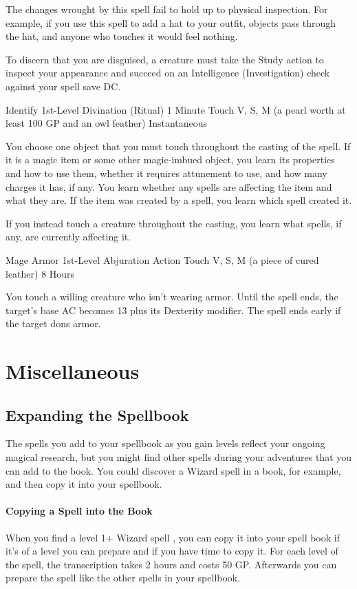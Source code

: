 \documentclass[letterpaper,openany,oneside,twocolumn]{book}
\begin{document}
The changes wrought by this spell fail to hold up to physical inspection. For example, if you use this spell to add a hat to your outfit, objects pass through the hat, and anyone who touches it would feel nothing. 

To discern that you are disguised, a creature must take the Study action to inspect your appearance and succeed on an Intelligence (Investigation) check against your spell save DC. 

\DndSpellHeader
  {Identify}
  {1st-Level Divination (Ritual)}
  {1 Minute}
  {Touch}
  {V, S, M (a pearl worth at least 100 GP and an owl feather)}
  {Instantaneous}

You choose one object that you must touch throughout the casting of the spell. If it is a magic item or some other magic-imbued object, you learn its properties and how to use them, whether it requires attunement to use, and how many charges it has, if any. You learn whether any spells are affecting the item and what they are. If the item was created by a spell, you learn which spell created it.

If you instead touch a creature throughout the casting, you learn what spells, if any, are currently affecting it.

\DndSpellHeader
  {Mage Armor}
  {1st-Level Abjuration}
  {Action}
  {Touch}
  {V, S, M (a piece of cured leather)}
  {8 Hours}

You touch a willing creature who isn't wearing armor. Until the spell ends, the target's base AC becomes 13 plus its Dexterity modifier. The spell ends early if the target dons armor.

\vfill\eject

\section*{Miscellaneous}
\subsection*{Expanding the Spellbook}
The spells you add to your spellbook as you gain levels reflect your ongoing magical research, but you might find other spells during your adventures that you can add to the book. You could discover a Wizard spell in a book, for example, and then copy it into your spellbook.
\paragraph*{Copying a Spell into the Book} When you find a level 1+ Wizard spell , you can copy it into your
spell book if it's of a level you can prepare and if you have time to copy it. For each level of the spell, the transcription takes 2 hours and costs 50 GP. Afterwards you can prepare the spell like the other spells in your spellbook.
\end{document}
